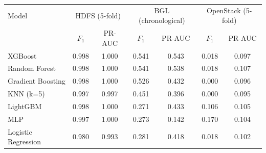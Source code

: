 \begin{tabular}{@{}lcccccc@{}}
\toprule
Model & \multicolumn{2}{c}{HDFS (5-fold)} & \multicolumn{2}{c}{BGL (chronological)} & \multicolumn{2}{c}{OpenStack (5-fold)} \\ & $F_1$ & PR-AUC & $F_1$ & PR-AUC & $F_1$ & PR-AUC \\
\midrule
XGBoost & 0.998 & 1.000 & 0.541 & 0.543 & 0.018 & 0.097 \\
Random Forest & 0.998 & 1.000 & 0.541 & 0.538 & 0.018 & 0.107 \\
Gradient Boosting & 0.998 & 1.000 & 0.526 & 0.432 & 0.000 & 0.096 \\
KNN (k=5) & 0.997 & 0.997 & 0.451 & 0.396 & 0.000 & 0.095 \\
LightGBM & 0.998 & 1.000 & 0.271 & 0.433 & 0.106 & 0.105 \\
MLP & 0.997 & 1.000 & 0.273 & 0.142 & 0.170 & 0.104 \\
Logistic Regression & 0.980 & 0.993 & 0.281 & 0.418 & 0.018 & 0.102 \\
\bottomrule
\end{tabular}
